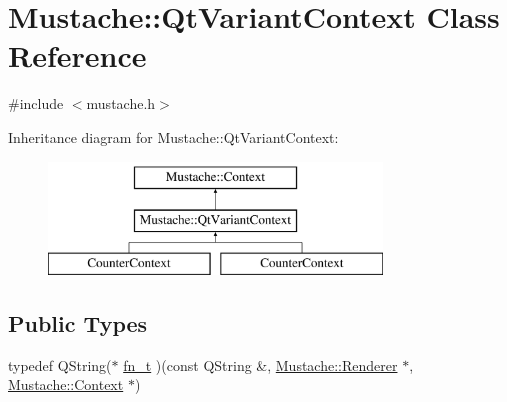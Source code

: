 \hypertarget{classMustache_1_1QtVariantContext}{\section{Mustache\-:\-:Qt\-Variant\-Context Class Reference}
\label{classMustache_1_1QtVariantContext}
}


{\ttfamily \#include $<$mustache.\-h$>$}

Inheritance diagram for Mustache\-:\-:Qt\-Variant\-Context\-:\begin{figure}[H]
\begin{center}
\leavevmode
\includegraphics[height=3.000000cm]{d5/d8b/classMustache_1_1QtVariantContext}
\end{center}
\end{figure}
\subsection*{Public Types}
\begin{DoxyCompactItemize}
\item 
typedef Q\-String($\ast$ \hyperlink{classMustache_1_1QtVariantContext_a3b258bcbe77d882a01c53abd1a9425d0}{fn\-\_\-t} )(const Q\-String \&, \hyperlink{classMustache_1_1Renderer}{Mustache\-::\-Renderer} $\ast$, \hyperlink{classMustache_1_1Context}{Mustache\-::\-Context} $\ast$)
\end{DoxyCompactItemize}
